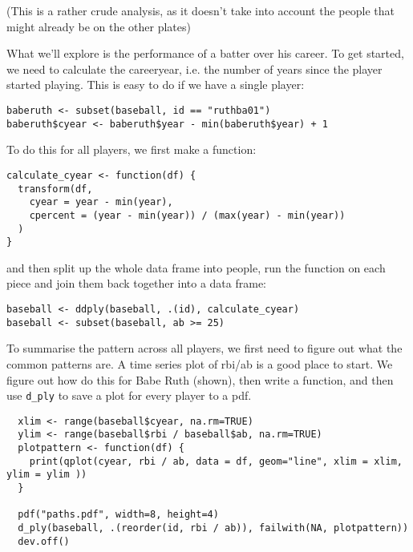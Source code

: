 \documentclass[letterpaper,oneside]{scrartcl}
\begin{document}
(This is a rather crude analysis, as it doesn't take into account the people that might already be on the other plates)

What we'll explore is the performance of a batter over his career.  To get started, we need to calculate the careeryear, i.e. the number of years since the player started playing.  This is easy to do if we have a single player:

\begin{verbatim}
baberuth <- subset(baseball, id == "ruthba01")
baberuth$cyear <- baberuth$year - min(baberuth$year) + 1
\end{verbatim}

To do this for all players, we first make a function:

\begin{verbatim}
calculate_cyear <- function(df) {
  transform(df, 
    cyear = year - min(year),
    cpercent = (year - min(year)) / (max(year) - min(year))
  )
}
\end{verbatim}

\noindent and then split up the whole data frame into people, run the function on each piece and join them back together into a data frame:


\begin{verbatim}
baseball <- ddply(baseball, .(id), calculate_cyear)
baseball <- subset(baseball, ab >= 25)
\end{verbatim}


To summarise the pattern across all players, we first need to figure out what the common patterns are.  A time series plot of rbi/ab is a good place to start.  We figure out how do this for Babe Ruth (shown), then write a function, and then use {\tt d\_ply} to save a plot for every player to a pdf.

\begin{verbatim}
  xlim <- range(baseball$cyear, na.rm=TRUE)
  ylim <- range(baseball$rbi / baseball$ab, na.rm=TRUE)
  plotpattern <- function(df) {
    print(qplot(cyear, rbi / ab, data = df, geom="line", xlim = xlim, ylim = ylim ))
  }
  
  pdf("paths.pdf", width=8, height=4)
  d_ply(baseball, .(reorder(id, rbi / ab)), failwith(NA, plotpattern))
  dev.off()
\end{verbatim}
\end{document}
